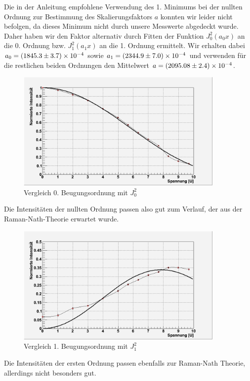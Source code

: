 Die in der Anleitung empfohlene Verwendung des 1. Minimums bei der nullten Ordnung zur Bestimmung des Skalierungsfaktors $ a $ konnten wir leider nicht befolgen, da dieses Minimum nicht durch unsere Messwerte abgedeckt wurde. Daher haben wir den Faktor alternativ durch Fitten der Funktion $J_0^2(a_0 x)$ an die 0. Ordnung bzw. $J_1^2(a_1 x)$ an die 1. Ordnung ermittelt. Wir erhalten dabei $a_0 = (1845.3 \pm 3.7)\times 10^{-4}$ sowie $a_1 = (2344.9 \pm 7.0)\times 10^{-4} $ und verwenden für die restlichen beiden Ordnungen den Mittelwert $a = (2095.08 \pm 2.4)\times 10^{-4}$. 

\begin{figure}[H]
 \includegraphics[width=0.9\textwidth]{Bilder/raman/raman-fit_0.png}
 \caption{Vergleich 0. Beugungsordnung mit $J_0^2$}
\end{figure}
Die Intensitäten der nullten Ordnung passen also gut zum Verlauf, der aus der Raman-Nath-Theorie erwartet wurde.
\begin{figure}[H]
 \includegraphics[width=0.9\textwidth]{Bilder/raman/raman-fit_1.png}
 \caption{Vergleich 1. Beugungsordnung mit $J_1^2$}
\end{figure}
Die Intensitäten der ersten Ordnung passen ebenfalls zur Raman-Nath Theorie, allerdings nicht besonders gut.
